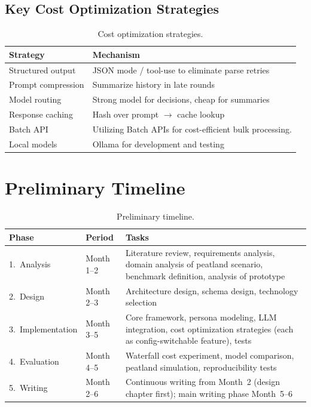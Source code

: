 \documentclass[12pt, a4paper]{article}
\begin{document}
\subsection*{Key Cost Optimization Strategies}

\begin{table}[H]
    \centering
    \small
    \begin{tabularx}{\textwidth}{lX}
        \toprule
        \textbf{Strategy} & \textbf{Mechanism}\\
        \midrule
        Structured output    & JSON mode / tool-use to eliminate parse retries \\
        Prompt compression   & Summarize history in late rounds \\
        Model routing        & Strong model for decisions, cheap for summaries \\
        Response caching     & Hash over prompt $\to$ cache lookup \\
        Batch API            & Utilizing Batch APIs for cost-efficient bulk processing. \\
        Local models         & Ollama for development and testing                            \\
        \bottomrule
    \end{tabularx}
    \caption{Cost optimization strategies.}
    \label{tab:cost}
\end{table}

\section{Preliminary Timeline}

\begin{table}[h!]
    \centering
    \begin{tabularx}{\textwidth}{llX}
        \toprule
        \textbf{Phase} & \textbf{Period} & \textbf{Tasks} \\
        \midrule
        1.\ Analysis
            & Month 1--2
            & Literature review, requirements analysis, domain analysis of peatland scenario, benchmark definition, analysis of prototype \\
        2.\ Design
            & Month 2--3
            & Architecture design, schema design, technology selection \\
        3.\ Implementation
            & Month 3--5
            & Core framework, persona modeling, LLM integration, cost optimization strategies (each as config-switchable feature), tests \\
        4.\ Evaluation
            & Month 4--5
            & Waterfall cost experiment, model comparison, peatland simulation, reproducibility tests \\
        5.\ Writing
            & Month 2--6
            & Continuous writing from Month~2 (design chapter first); main writing phase Month~5--6 \\
        \bottomrule
    \end{tabularx}
    \caption{Preliminary timeline.}
    \label{tab:timeline}
\end{table}
\end{document}
